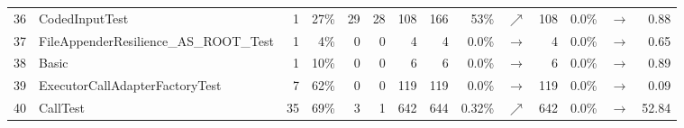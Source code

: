 \begin{table}
\begin{tabular}{|llrrrr|rrrr|rrr|r|}
		\rowcolor[HTML]{EFEFEF}
		36&\scriptsize{CodedInputTest}&1&27\%&29&28&108&166&53\%&{\color{ForestGreen}$\nearrow$}&108&0.0\%&$\rightarrow$&0.88 \\
		37&\scriptsize{FileAppenderResilience\_AS\_ROOT\_Test}&1&4\%&0&0&4&4&0.0\%&$\rightarrow$&4&0.0\%&$\rightarrow$&0.65 \\
		\rowcolor[HTML]{EFEFEF}
		38&\scriptsize{Basic}&1&10\%&0&0&6&6&0.0\%&$\rightarrow$&6&0.0\%&$\rightarrow$&0.89 \\
		39&\scriptsize{ExecutorCallAdapterFactoryTest}&7&62\%&0&0&119&119&0.0\%&$\rightarrow$&119&0.0\%&$\rightarrow$&0.09 \\
		\rowcolor[HTML]{EFEFEF}
		40&\scriptsize{CallTest}&35&69\%&3&1&642&644&0.32\%&{\color{ForestGreen}$\nearrow$}&642&0.0\%&$\rightarrow$&52.84 \\
		\hline
	\end{tabular}
\end{table}